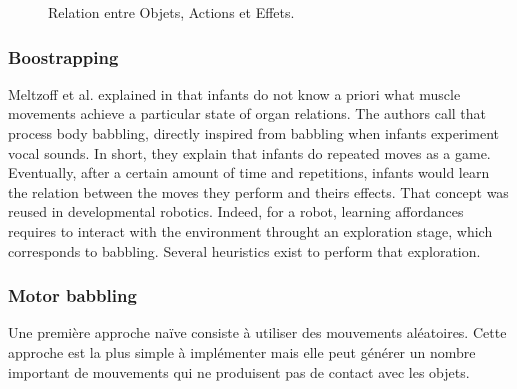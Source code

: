 \documentclass{llncs}
\begin{document}

\begin{figure}[!h]
\centering

  \label{fig:affordances}
	\caption{Relation entre Objets, Actions et Effets.}

\end{figure}

\subsubsection{Boostrapping}
Meltzoff et al. explained in \cite{EDP:EDP157} that infants do not know a priori what muscle movements achieve a particular state of organ relations. The authors call that process body babbling, directly inspired from babbling when infants experiment vocal sounds. In short, they explain that infants do repeated moves as a game. Eventually, after a certain amount of time and repetitions, infants would learn the relation between the moves they perform and theirs effects. That concept was reused in developmental robotics. Indeed, for a robot, learning affordances requires to interact with the environment throught an exploration stage, which corresponds to babbling. Several heuristics exist to perform that exploration.

\subsubsection{Motor babbling}
Une première approche naïve consiste à utiliser des mouvements aléatoires. Cette approche est la plus simple à implémenter mais elle peut générer un nombre important de mouvements qui ne produisent pas de contact avec les objets.
\end{document}
